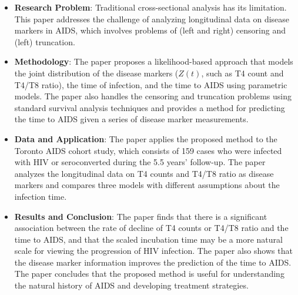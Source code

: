 \documentclass[UTF8,a4paper,10pt]{article}
\begin{document}
\begin{itemize}
  \item \textbf{Research Problem}: Traditional cross-sectional analysis has its limitation. This paper addresses the challenge of analyzing longitudinal data on disease markers in AIDS, which involves problems of (left and right) censoring and (left) truncation.
  \item \textbf{Methodology}: The paper proposes a likelihood-based approach that models the joint distribution of the disease markers (\(Z(t)\), such as T4 count and T4/T8 ratio), the time of infection, and the time to AIDS using parametric models. The paper also handles the censoring and truncation problems using standard survival analysis techniques and provides a method for predicting the time to AIDS given a series of disease marker measurements.
  \item \textbf{Data and Application}: The paper applies the proposed method to the Toronto AIDS cohort study, which consists of 159 cases who were infected with HIV or seroconverted during the 5.5 years' follow-up. The paper analyzes the longitudinal data on T4 counts and T4/T8 ratio as disease markers and compares three models with different assumptions about the infection time.
  \item \textbf{Results and Conclusion}: The paper finds that there is a significant association between the rate of decline of T4 counts or T4/T8 ratio and the time to AIDS, and that the scaled incubation time may be a more natural scale for viewing the progression of HIV infection. The paper also shows that the disease marker information improves the prediction of the time to AIDS. The paper concludes that the proposed method is useful for understanding the natural history of AIDS and developing treatment strategies.
\end{itemize}



\end{document}
